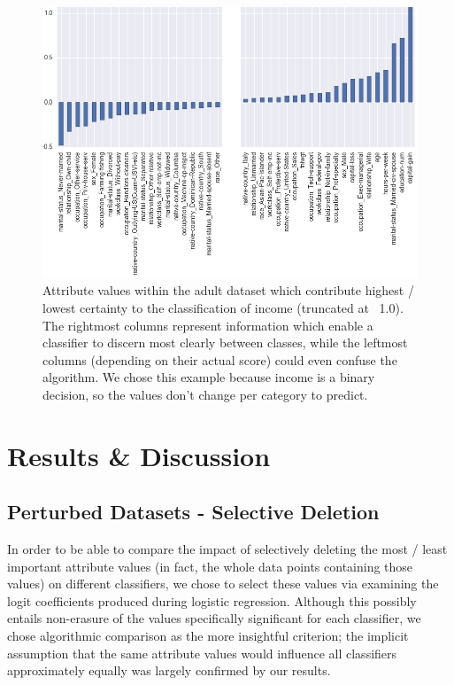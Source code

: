 \documentclass{llncs}
\begin{document}
\begin{figure}[!h]
	\begin{center}
    	\hspace*{-0.8cm}
		\includegraphics[width=1.1\textwidth]{figures/theory/important_columns_income_truncated}
		\caption{Attribute values within the adult dataset which contribute highest / lowest certainty to the classification of income (truncated at ~1.0). The rightmost columns represent information which enable a classifier to discern most clearly between classes, while the leftmost columns (depending on their actual score) could even confuse the algorithm. We chose this example because income is a binary decision, so the values don't change per category to predict.}
		\label{fig:adult_important_columns}
	\end{center}
\end{figure}



\section{Results \& Discussion}
\label{sect:results}


\subsection{Perturbed Datasets - Selective Deletion}
\label{ssect:selective_deletion}

In order to be able to compare the impact of selectively deleting the most / least important attribute values (in fact, the whole data points containing those values) on different classifiers, we chose to select these values via examining the logit coefficients produced during logistic regression. Although this possibly entails non-erasure of the values specifically significant for each classifier, we chose algorithmic comparison as the more insightful criterion; the implicit assumption that the same attribute values would influence all classifiers approximately equally was largely confirmed by our results.
\end{document}
